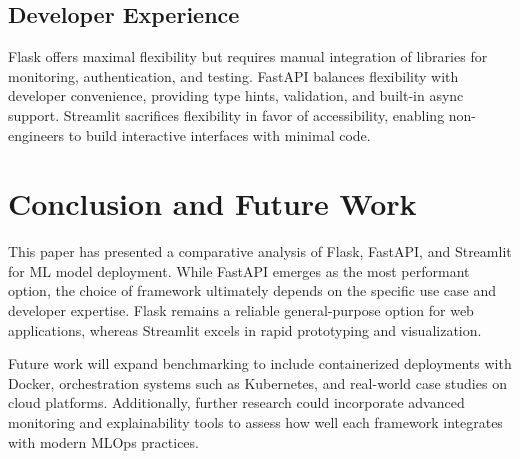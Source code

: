 \documentclass[12pt]{article}
\begin{document}
\subsection{Developer Experience}
Flask offers maximal flexibility but requires manual integration of libraries for monitoring, authentication, and testing. FastAPI balances flexibility with developer convenience, providing type hints, validation, and built-in async support. Streamlit sacrifices flexibility in favor of accessibility, enabling non-engineers to build interactive interfaces with minimal code.


\section{Conclusion and Future Work}
This paper has presented a comparative analysis of Flask, FastAPI, and Streamlit for ML model deployment. While FastAPI emerges as the most performant option, the choice of framework ultimately depends on the specific use case and developer expertise. Flask remains a reliable general-purpose option for web applications, whereas Streamlit excels in rapid prototyping and visualization.

Future work will expand benchmarking to include containerized deployments with Docker, orchestration systems such as Kubernetes, and real-world case studies on cloud platforms. Additionally, further research could incorporate advanced monitoring and explainability tools to assess how well each framework integrates with modern MLOps practices.




\end{document}
